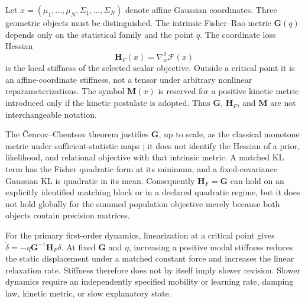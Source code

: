 \documentclass[12pt]{article}
\begin{document}
Let $x=(\mu_1,\ldots,\mu_N,\Sigma_1,\ldots,\Sigma_N)$ denote affine Gaussian coordinates. Three geometric objects must be distinguished. The intrinsic Fisher--Rao metric $\mathbf G(q)$ depends only on the statistical family and the point $q$. The coordinate loss Hessian
\begin{equation}
\mathbf H_F(x)=\nabla_x^2\mathcal F(x)
\label{eq:loss_hessian_definition}
\end{equation}
is the local stiffness of the selected scalar objective. Outside a critical point it is an affine-coordinate stiffness, not a tensor under arbitrary nonlinear reparameterizations. The symbol $\mathbf M(x)$ is reserved for a positive kinetic metric introduced only if the kinetic postulate is adopted. Thus $\mathbf G$, $\mathbf H_F$, and $\mathbf M$ are not interchangeable notation.

The {\v C}encov--Chentsov theorem justifies $\mathbf G$, up to scale, as the classical monotone metric under sufficient-statistic maps \citep{Cencov1982}; it does not identify the Hessian of a prior, likelihood, and relational objective with that intrinsic metric. A matched KL term has the Fisher quadratic form at its minimum, and a fixed-covariance Gaussian KL is quadratic in its mean. Consequently $\mathbf H_F=\mathbf G$ can hold on an explicitly identified matching block or in a declared quadratic regime, but it does not hold globally for the summed population objective merely because both objects contain precision matrices.

For the primary first-order dynamics, linearization at a critical point gives $\dot\delta=-\eta\mathbf G^{-1}\mathbf H_F\delta$.  At fixed $\mathbf G$ and $\eta$, increasing a positive modal stiffness reduces the static displacement under a matched constant force and increases the linear relaxation rate.  Stiffness therefore does not by itself imply slower revision.  Slower dynamics require an independently specified mobility or learning rate, damping law, kinetic metric, or slow explanatory state.
\end{document}
